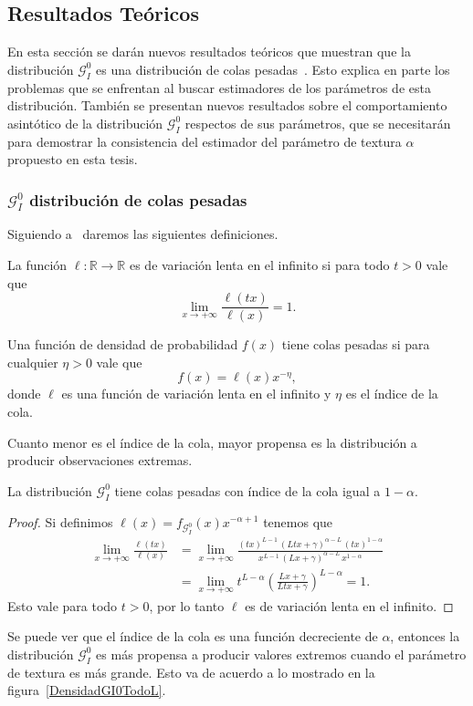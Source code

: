 \subsection{Resultados Teóricos}
\label{ResultadosTeoricosGI0}

En esta sección se darán nuevos resultados teóricos que muestran que la distribución $\mathcal{G}_I^0$ es una distribución de colas pesadas~\cite{gambini2015}. Esto explica en parte los problemas que se enfrentan al buscar estimadores de los parámetros de esta distribución.  También se presentan nuevos resultados sobre el comportamiento asintótico de la distribución $\mathcal{G}_I^0$ respectos de sus parámetros, que se necesitarán para demostrar la consistencia del estimador del parámetro de textura $\alpha$ propuesto en esta tesis.

\subsubsection{$\mathcal{G}_I^0$ distribución de colas pesadas}
\label{colas}
Siguiendo a~\cite{Gre,Jorgensen,Rojo} daremos las siguientes definiciones.

\begin{definition} \label{Def:lenta}
	La función $\ell\colon\mathbb R \to\mathbb R$ es de variación lenta en el infinito si para todo $t>0$ vale que
	$$
	\lim_{x\to+\infty}\dfrac{\ell (tx)}{\ell(x)}=1.
	$$
\end{definition}

\begin{definition} 
	Una función de densidad de probabilidad $f(x)$ tiene colas pesadas si para cualquier $\eta >0$ vale que
	$$
	f(x)=\ell(x)  x^{-\eta},
	$$
	donde $\ell$ es una función de variación lenta en el infinito y $\eta$ es el índice de la cola.
\end{definition}
Cuanto menor es el índice de la cola, mayor propensa es la distribución a producir observaciones extremas.

\begin{proposition}
	La distribución $\mathcal G_{I}^0$ tiene colas pesadas con índice de la cola igual a $1-\alpha$.
\end{proposition}
\begin{proof}
	Si definimos $\ell(x)=f_{\mathcal G_I^0}(x) x^{-\alpha+1}$ tenemos que
	\begin{align*}
	\lim_{x\to+\infty}\frac{\ell(t x)}{\ell(x)}&=\lim_{x\to+\infty}\frac{(tx)^{L-1} \, (Ltx+\gamma)^{\alpha-L} \, (tx)^{1-\alpha}}{x^{L-1} \, (Lx+\gamma)^{\alpha-L} \, x^{1-\alpha}}\\
	&=\lim_{x\to+\infty}t^{L-\alpha}\left(\frac{Lx+\gamma}{L tx+\gamma}\right)^{L-\alpha}=1.
	\end{align*}
	Esto vale para todo $t>0$, por lo tanto $\ell$ es de variación lenta en el infinito.
\end{proof}
Se puede ver que el índice de la cola es una función decreciente de $\alpha$, entonces la distribución $\mathcal G_I^0$ es más propensa a producir valores extremos cuando el parámetro de textura es más grande. Esto va de acuerdo a lo mostrado en la figura~\ref{DensidadGI0TodoL}.

